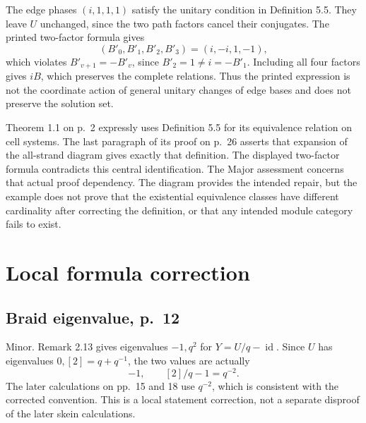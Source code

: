 \documentclass[10pt]{article}
\begin{document}
The edge phases \((i,1,1,1)\) satisfy the unitary condition in Definition 5.5. They leave \(U\) unchanged, since the two path factors cancel their conjugates. The printed two-factor formula gives \[(B'_0,B'_1,B'_2,B'_3)=(i,-i,1,-1),\] which violates \(B'_{v+1}=-B'_v\), since \(B'_2=1\ne i=-B'_1\). Including all four factors gives \(iB\), which preserves the complete relations. Thus the printed expression is not the coordinate action of general unitary changes of edge bases and does not preserve the solution set.\par
Theorem 1.1 on p. 2 expressly uses Definition 5.5 for its equivalence relation on cell systems. The last paragraph of its proof on p. 26 asserts that expansion of the all-strand diagram gives exactly that definition. The displayed two-factor formula contradicts this central identification. The Major assessment concerns that actual proof dependency. The diagram provides the intended repair, but the example does not prove that the existential equivalence classes have different cardinality after correcting the definition, or that any intended module category fails to exist.\par
\section*{Local formula correction}
\subsection*{Braid eigenvalue, p. 12}
Minor. Remark 2.13 gives eigenvalues \(-1,q^2\) for \(Y=U/q-\operatorname{id}\). Since \(U\) has eigenvalues \(0,[2]=q+q^{-1}\), the two values are actually \[-1,\qquad [2]/q-1=q^{-2}.\] The later calculations on pp. 15 and 18 use \(q^{-2}\), which is consistent with the corrected convention. This is a local statement correction, not a separate disproof of the later skein calculations.\par
\end{document}

